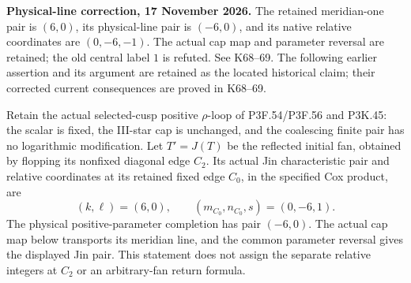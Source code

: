\begin{theorem}\label{night:P3K.46}
\par\noindent\textbf{Physical-line correction, 17 November 2026.} The retained meridian-one pair is \((6,0)\), its physical-line pair is \((-6,0)\), and its native relative coordinates are \((0,-6,-1)\). The actual cap map and parameter reversal are retained; the old central label \(1\) is refuted. See K68--69. The following earlier assertion and its argument are retained as the located historical claim; their corrected current consequences are proved in K68--69.\medskip\par 
Retain the actual selected-cusp positive \(\rho\)-loop of
P3F.54/P3F.56 and P3K.45: the scalar is fixed, the III-star cap
is unchanged, and the coalescing finite pair has no logarithmic
modification. Let \(T'=J(T)\) be the reflected initial fan, obtained
by flopping its nonfixed diagonal edge \(C_2\). Its actual Jin
characteristic pair and relative coordinates at its retained fixed
edge \(C_0\), in the specified Cox product, are
\[
 (k,\ell)=(6,0),\qquad
 (m_{C_0},n_{C_0},s)=(0,-6,1).
\]
The physical positive-parameter completion has pair \((-6,0)\).
The actual cap map below transports its meridian line, and the common
parameter reversal gives the displayed Jin pair. This statement
does not assign the separate relative integers at \(C_2\) or an
arbitrary-fan return formula.
\end{theorem}
